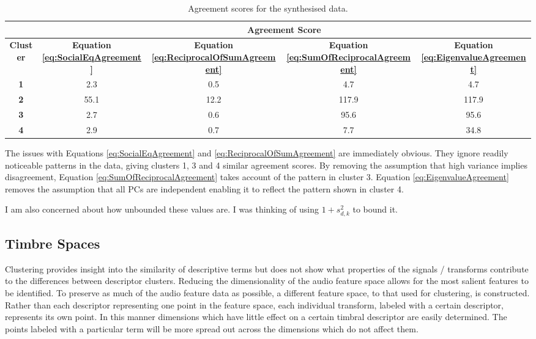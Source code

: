 			\begin{table}[h!]
				\centering
				\begin{tabular}{|c|c|c|c|c|}
					\cline{2-5}
					\multicolumn{1}{c|}{} & \multicolumn{4}{c|}{\bf{Agreement Score}} \tabularnewline
					\hline
					\bf{Cluster} & \bf{Equation \ref{eq:SocialEqAgreement}} & 
					\bf{Equation \ref{eq:ReciprocalOfSumAgreement}} &
					\bf{Equation \ref{eq:SumOfReciprocalAgreement}} & 
					\bf{Equation \ref{eq:EigenvalueAgreement}} \tabularnewline
					\hline
					\hline
					\bf{1} & 2.3 & 0.5 & 4.7 & 4.7 \tabularnewline
					\hline
					\bf{2} & 55.1 & 12.2 & 117.9 & 117.9 \tabularnewline
					\hline
					\bf{3} & 2.7 & 0.6 & 95.6 & 95.6 \tabularnewline
					\hline
					\bf{4} & 2.9 & 0.7 & 7.7 & 34.8 \tabularnewline
					\hline
				\end{tabular}
				\caption{Agreement scores for the synthesised data.}
				\label{tab:SynthesisedDataAgreement}
			\end{table}

			The issues with Equations \ref{eq:SocialEqAgreement} and \ref{eq:ReciprocalOfSumAgreement} are
			immediately obvious. They ignore readily noticeable patterns in the data, giving clusters 1, 3 and
			4 similar agreement scores. By removing the assumption that high variance implies disagreement,
			Equation \ref{eq:SumOfReciprocalAgreement} takes account of the pattern in cluster 3. Equation
			\ref{eq:EigenvalueAgreement} removes the assumption that all PCs are independent enabling it to
			reflect the pattern shown in cluster 4.

			\note
			{
				I am also concerned about how unbounded these values are. I was thinking of using $1 +
				s_{d,k}^{2}$ to bound it.
			}

	\subsection{Timbre Spaces}
	\label{sec:TimbreEvaluation-Analysis-TimbreSpaces}
		Clustering provides insight into the similarity of descriptive terms but does not show what properties of
		the signals / transforms contribute to the differences between descriptor clusters. Reducing the
		dimensionality of the audio feature space allows for the most salient features to be identified. To
		preserve as much of the audio feature data as possible, a different feature space, to that used for
		clustering, is constructed. Rather than each descriptor representing one point in the feature space, each
		individual transform, labeled with a certain descriptor, represents its own point. In this manner
		dimensions which have little effect on a certain timbral descriptor are easily determined. The points
		labeled with a particular term will be more spread out across the dimensions which do not affect them. 
		
